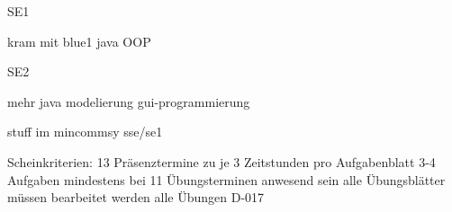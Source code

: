 \documentclass[12pt]{article}
\begin{document}
SE1

kram mit blue1
java
OOP

SE2

mehr java
modelierung
gui-programmierung


stuff im mincommsy sse/se1

Scheinkriterien:
13 Präsenztermine zu je 3 Zeitstunden
pro Aufgabenblatt 3-4 Aufgaben
mindestens bei 11 Übungsterminen anwesend sein
alle Übungsblätter müssen bearbeitet werden
alle Übungen D-017
\end{document}
